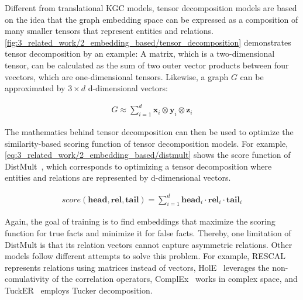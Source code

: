 Different from translational KGC models, tensor decomposition models are based on the idea that the graph embedding space can be expressed as a composition of many smaller tensors that represent entities and relations. \autoref{fig:3_related_work/2_embedding_based/tensor_decomposition} demonstrates tensor decomposition by an example: A matrix, which is a two-dimensional tensor, can be calculated as the sum of two outer vector products between four vecctors, which are one-dimensional tensors. Likewise, a graph $G$ can be approximated by $3 \times d$ d-dimensional vectors:

\begin{align}
    G \approx \sum_{i=1}^{d} \textbf{x}_i \otimes \textbf{y}_i \otimes \textbf{z}_i
    \label{eq:3_related_work/2_embedding_based/tensor_decomposition}
\end{align}

The mathematics behind tensor decomposition can then be used to optimize the similarity-based scoring function of tensor decomposition models. For example, \autoref{eq:3_related_work/2_embedding_based/distmult} shows the score function of DistMult~\cite{Yang2015EmbeddingEA}, which corresponds to optimizing a tensor decomposition where entities and relations are represented by d-dimensional vectors.

\begin{align}
    score(\textbf{head}, \textbf{rel}, \textbf{tail}) = \sum_{i=1}^{d} \textbf{head}_i \cdot \textbf{rel}_i \cdot \textbf{tail}_i
    \label{eq:3_related_work/2_embedding_based/distmult}
\end{align}

Again, the goal of training is to find embeddings that maximize the scoring function for true facts and minimize it for false facts. Thereby, one limitation of DistMult is that its relation vectors cannot capture asymmetric relations. Other models follow different attempts to solve this problem. For example, RESCAL~\cite{Nickel2013TensorFF} represents relations using matrices instead of vectors, HolE~\cite{Nickel2016HolographicEO} leverages the non-comulativity of the correlation operators, ComplEx~\cite{Trouillon2016ComplexEF} works in complex space, and TuckER~\cite{Balazevic2019TuckERTF} employs Tucker decomposition.

